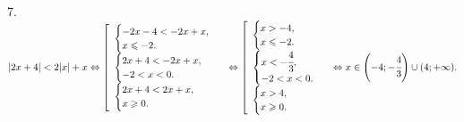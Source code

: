 7. $|2x+4|<2|x|+x \Leftrightarrow \left[\begin{array}{l}\begin{cases}-2x-4<-2x+x,\\ x\leqslant-2.\end{cases}\\ \begin{cases}2x+4<-2x+x,\\ -2<x<0.\end{cases}\\ \begin{cases}2x+4<2x+x,\\ x\geqslant0.\end{cases} \end{array}\right.\Leftrightarrow \left[\begin{array}{l}\begin{cases}x>-4,\\ x\leqslant-2.\end{cases}\\ \begin{cases}x<-\cfrac{4}{3},\\ -2<x<0.\end{cases}\\ \begin{cases}x>4,\\ x\geqslant0.\end{cases} \end{array}\right.\Leftrightarrow
x\in\left(-4;-\cfrac{4}{3}\right)\cup(4;+\infty).$\\
